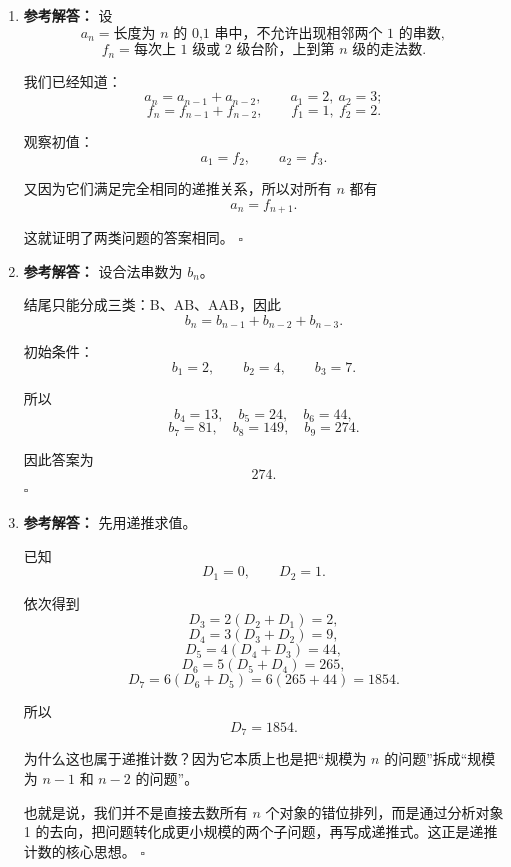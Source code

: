 \documentclass[11pt,a4paper,fontset=fandol]{ctexart}
\newenvironment{solution}{\par\noindent\textbf{参考解答：}}{\hfill$\square$\par}
\begin{document}
\begin{enumerate}
\begin{solution}
  因此
  \[
  s_n=s_{n-1}+2s_{n-2}.
  \]

  初始条件为
  \[
  s_1=1,\qquad s_2=3.
  \]

  所以
  \[
  s_3=5,\quad s_4=11,\quad s_5=21,\quad s_6=43.
  \]

  因此答案为
  \[
  43.
  \]
  \end{solution}

  \item \begin{solution}
  设
  \[
  a_n=\text{长度为 $n$ 的 0,1 串中，不允许出现相邻两个 1 的串数},
  \]
  \[
  f_n=\text{每次上 1 级或 2 级台阶，上到第 $n$ 级的走法数}.
  \]

  我们已经知道：
  \[
  a_n=a_{n-1}+a_{n-2},
  \qquad a_1=2,\ a_2=3;
  \]
  \[
  f_n=f_{n-1}+f_{n-2},
  \qquad f_1=1,\ f_2=2.
  \]

  观察初值：
  \[
  a_1=f_2,
  \qquad
  a_2=f_3.
  \]

  又因为它们满足完全相同的递推关系，所以对所有 $n$ 都有
  \[
  a_n=f_{n+1}.
  \]

  这就证明了两类问题的答案相同。
  \end{solution}

  \item \begin{solution}
  设合法串数为 $b_n$。

  结尾只能分成三类：B、AB、AAB，因此
  \[
  b_n=b_{n-1}+b_{n-2}+b_{n-3}.
  \]

  初始条件：
  \[
  b_1=2,\qquad b_2=4,\qquad b_3=7.
  \]

  所以
  \[
  b_4=13,\quad b_5=24,\quad b_6=44,
  \]
  \[
  b_7=81,\quad b_8=149,\quad b_9=274.
  \]

  因此答案为
  \[
  274.
  \]
  \end{solution}

  \item \begin{solution}
  先用递推求值。

  已知
  \[
  D_1=0,\qquad D_2=1.
  \]

  依次得到
  \[
  D_3=2(D_2+D_1)=2,
  \]
  \[
  D_4=3(D_3+D_2)=9,
  \]
  \[
  D_5=4(D_4+D_3)=44,
  \]
  \[
  D_6=5(D_5+D_4)=265,
  \]
  \[
  D_7=6(D_6+D_5)=6(265+44)=1854.
  \]

  所以
  \[
  D_7=1854.
  \]

  为什么这也属于递推计数？因为它本质上也是把“规模为 $n$ 的问题”拆成“规模为 $n-1$ 和 $n-2$ 的问题”。

  也就是说，我们并不是直接去数所有 $n$ 个对象的错位排列，而是通过分析对象 1 的去向，把问题转化成更小规模的两个子问题，再写成递推式。这正是递推计数的核心思想。
  \end{solution}


\end{enumerate}
\end{document}
